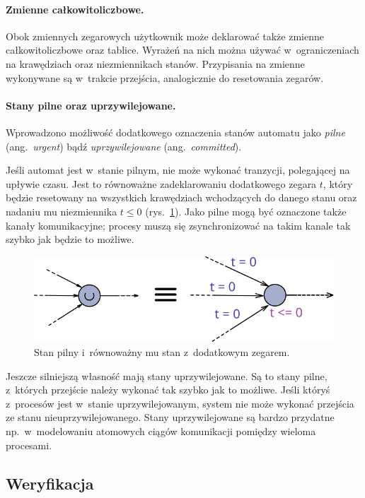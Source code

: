 \documentclass{pracamgr}
\newcommand{\ang}[1]{(ang.~\emph{#1})}
\newcommand{\imgr}[1]{rys.~\ref{#1}}
\theoremstyle{plain}
\begin{document}
\paragraph{Zmienne całkowitoliczbowe.} Obok zmiennych zegarowych
użytkownik może deklarować także zmienne całkowitoliczbowe oraz
tablice. Wyrażeń na nich można używać w~ograniczeniach na krawędziach
oraz niezmiennikach stanów. Przypisania na zmienne wykonywane są
w~trakcie przejścia, analogicznie do resetowania zegarów.

\paragraph{Stany pilne oraz uprzywilejowane.} Wprowadzono możliwość
dodatkowego oznaczenia stanów automatu jako \emph{pilne}
\ang{urgent} bądź \emph{uprzywilejowane} \ang{committed}.

Jeśli automat jest w~stanie pilnym, nie może wykonać tranzycji,
polegającej na upływie czasu. Jest to równoważne zadeklarowaniu
dodatkowego zegara $t$, który będzie resetowany na wszystkich
krawędziach wchodzących do danego stanu oraz nadaniu mu
niezmiennika $t \leq 0$ (\imgr{img:uppaal-urgent}). Jako pilne mogą
być oznaczone także kanały komunikacyjne; procesy muszą się
zsynchronizować na takim kanale tak szybko jak będzie to możliwe.

\begin{figure}[h]
  \centering
  \includegraphics[width=.5\textwidth]{img/uppaal-urgent}
  \caption{Stan pilny i~równoważny mu stan z~dodatkowym
    zegarem.}
  \label{img:uppaal-urgent}
\end{figure}

Jeszcze silniejszą własność mają stany uprzywilejowane. Są to stany
pilne, z~których przejście należy wykonać tak szybko jak to
możliwe. Jeśli któryś z~procesów jest w~stanie uprzywilejowanym,
system nie może wykonać przejścia ze stanu nieuprzywilejowanego.
Stany uprzywilejowane są bardzo przydatne np.~w~modelowaniu atomowych
ciągów komunikacji pomiędzy wieloma procesami.

\subsection{Weryfikacja}
\end{document}
